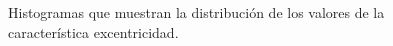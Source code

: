 \documentclass{article}
\begin{document}
\begin{figure}[htbp]

\caption{Histogramas que muestran la distribución de los valores de la característica excentricidad. }
\label{fig11} 
\end{figure}
\end{document}
